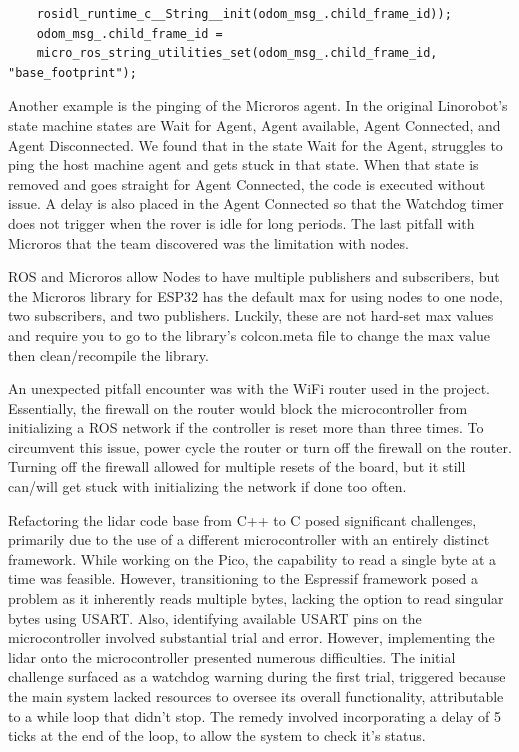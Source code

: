 \documentclass[conference]{IEEEtran}
\begin{document}
\begingroup
\fontsize{5.70pt}{10pt}\selectfont
\begin{verbatim}  
	rosidl_runtime_c__String__init(odom_msg_.child_frame_id));
	odom_msg_.child_frame_id = 
	micro_ros_string_utilities_set(odom_msg_.child_frame_id, "base_footprint");  
\end{verbatim}  
\endgroup

Another example is the pinging of the Microros agent. In the original Linorobot's state machine states are Wait for Agent, Agent available, Agent Connected, and Agent Disconnected. We found that in the state Wait for the Agent, struggles to ping the host machine agent and gets stuck in that state. When that state is removed and goes straight for Agent Connected, the code is executed without issue. A delay is also placed in the Agent Connected so that the Watchdog timer does not trigger when the rover is idle for long periods. The last pitfall with Microros that the team discovered was the limitation with nodes.

ROS and Microros allow Nodes to have multiple publishers and subscribers, but the Microros library for ESP32 has the default max for using nodes to one node, two subscribers, and two publishers. Luckily, these are not hard-set max values and require you to go to the library’s colcon.meta file to change the max value then clean/recompile the library.

An unexpected pitfall encounter was with the WiFi router used in the project. Essentially, the firewall on the router would block the microcontroller from initializing a ROS network if the controller is reset more than three times. To circumvent this issue, power cycle the router or turn off the firewall on the router. Turning off the firewall allowed for multiple resets of the board, but it still can/will get stuck with initializing the network if done too often.
 
Refactoring the lidar code base from C++ to C posed significant challenges, primarily due to the use of a different microcontroller with an entirely distinct framework. While working on the Pico, the capability to read a single byte at a time was feasible. However, transitioning to the Espressif framework posed a problem as it inherently reads multiple bytes, lacking the option to read singular bytes using USART. Also, identifying available USART pins on the microcontroller involved substantial trial and error. However, implementing the lidar onto the microcontroller presented numerous difficulties. The initial challenge surfaced as a watchdog warning during the first trial, triggered because the main system lacked resources to oversee its overall functionality, attributable to a while loop that didn't stop. The remedy involved incorporating a delay of 5 ticks at the end of the loop, to allow the system to check it’s status.
\end{document}
